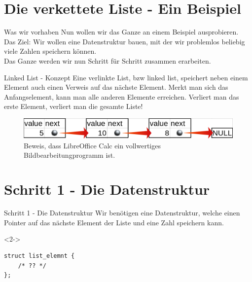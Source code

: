 \section{Die verkettete Liste - Ein Beispiel}

\begin{frame}[fragile]{Was wir vorhaben}
Nun wollen wir das Ganze an einem Beispiel ausprobieren.\\
\bigskip
Das Ziel: Wir wollen eine Datenstruktur bauen, mit der wir problemlos beliebig viele Zahlen speichern können. \\
\bigskip
Das Ganze werden wir nun Schritt für Schritt zusammen erarbeiten.
\end{frame}


\begin{frame}[fragile]{Linked List - Konzept}
Eine verlinkte List, bzw linked list, speichert neben einem Element auch einen Verweis auf das nächste Element. Merkt man sich das Anfangselement, kann man alle anderen Elemente erreichen. Verliert man das erste Element, verliert man die gesamte Liste!
\\
\bigskip
\begin{figure}
 \centering
 \includegraphics[width = \linewidth]{../img/stack_heap.png}
 \caption{Beweis, dass LibreOffice Calc ein vollwertiges Bildbearbeitungprogramm ist.}
 \label{figure:example}
\end{figure}


\end{frame}


\section{Schritt 1 - Die Datenstruktur}
\begin{frame}[fragile]{Schritt 1 - Die Datenstruktur}
Wir benötigen eine Datenstruktur, welche einen Pointer auf das nächste Element der Liste und eine Zahl speichern kann.\\
\bigskip
{}
\bigskip

\begin{onlyenv}<2->
\begin{lstlisting}[numbers=none]
struct list_elemnt {
    /* ?? */
};
\end{lstlisting}
\end{onlyenv}

\end{frame}

